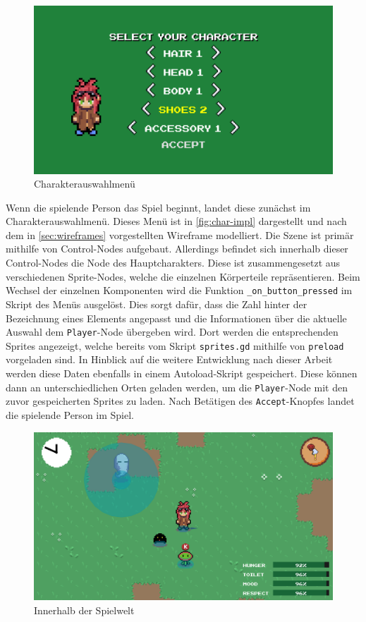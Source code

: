 \begin{figure}[H]
    \centering
    \includegraphics[width=0.8\columnwidth]{figures/screenshots/charselect.png}
    \caption{\label{fig:char-impl}Charakterauswahlmenü}
\end{figure}

Wenn die spielende Person das Spiel beginnt, landet diese zunächst im Charakterauswahlmenü.
Dieses Menü ist in \autoref{fig:char-impl} dargestellt und nach dem in \autoref{sec:wireframes} vorgestellten Wireframe modelliert.
Die Szene ist primär mithilfe von Control-Nodes aufgebaut.
Allerdings befindet sich innerhalb dieser Control-Nodes die Node des Hauptcharakters.
Diese ist zusammengesetzt aus verschiedenen Sprite-Nodes, welche die einzelnen Körperteile repräsentieren.
Beim Wechsel der einzelnen Komponenten wird die Funktion \texttt{\_on\_button\_pressed} im Skript des Menüs ausgelöst.
Dies sorgt dafür, dass die Zahl hinter der Bezeichnung eines Elements angepasst und die Informationen über die aktuelle Auswahl dem \texttt{Player}-Node übergeben wird.
Dort werden die entsprechenden Sprites angezeigt, welche bereits vom Skript \texttt{sprites.gd} mithilfe von \texttt{preload} vorgeladen sind.
In Hinblick auf die weitere Entwicklung nach dieser Arbeit werden diese Daten ebenfalls in einem Autoload-Skript gespeichert.
Diese können dann an unterschiedlichen Orten geladen werden, um die \texttt{Player}-Node mit den zuvor gespeicherten Sprites zu laden.
Nach Betätigen des \texttt{Accept}-Knopfes landet die spielende Person im Spiel. \\

\begin{figure}[H]
    \centering
    \includegraphics[width=0.8\columnwidth]{figures/screenshots/ingame.png}
    \caption{\label{fig:ingame}Innerhalb der Spielwelt}
\end{figure}

